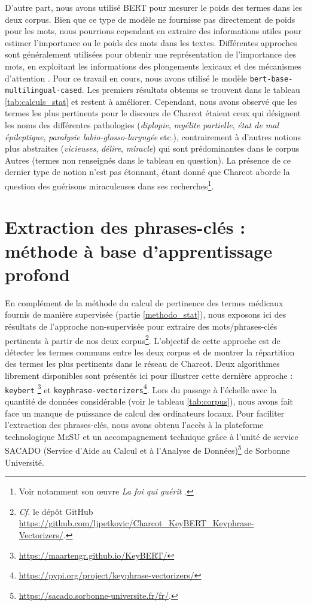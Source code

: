 D'autre part, nous avons utilisé \textsc{BERT} pour mesurer le poids des termes dans les deux corpus. Bien que ce type de modèle ne fournisse pas directement de poids pour les mots, nous pourrions cependant en extraire des informations utiles pour estimer l'importance ou le poids des mots dans les textes. Différentes approches sont généralement utilisées pour obtenir une représentation de l'importance des mots, en exploitant les informations des plongements lexicaux et des mécanismes d'attention \citep{vaswani2023}. Pour ce travail en cours, nous avons utilisé le modèle \texttt{bert-base-multilingual-cased}. Les premiers résultats obtenus se trouvent dans le tableau \ref{tab:calculs_stat} et restent à améliorer. Cependant, nous avons observé que les termes les plus pertinents pour le discours de Charcot étaient ceux qui désignent les noms des différentes pathologies (\textit{diplopie}, \textit{myélite partielle}, \textit{état de mal épileptique}, \textit{paralysie labio-glosso-laryngée} etc.), contrairement à d'autres notions plus abstraites (\textit{vicieuses}, \textit{délire}, \textit{miracle}) qui sont prédominantes dans le corpus
\og{}Autres\fg{} (termes non renseignés dans le tableau en question). La présence de ce dernier type de notion n'est pas étonnant, étant donné que Charcot aborde la question des guérisons miraculeuses dans ses recherches\footnote{Voir notamment son \oe{}uvre \textit{La foi qui guérit} \citep{charcot1897foi}.}. 



\section{Extraction des phrases-clés : méthode à base d'apprentissage profond}
En complément de la méthode du calcul de pertinence des termes médicaux fournis de manière supervisée (partie \ref{methodo_stat}), nous exposons ici des résultats de l'approche non-supervisée pour extraire des mots/phrases-clés  pertinents à partir de nos deux corpus\footnote{\textit{Cf.} le dépôt GitHub \url{https://github.com/ljpetkovic/Charcot\_KeyBERT\_Keyphrase-Vectorizers/}.}. L'objectif de cette approche est de détecter les termes communs entre les deux corpus et de montrer la répartition des termes les plus pertinents dans le réseau de Charcot. Deux algorithmes librement disponibles sont présentés ici pour illustrer cette dernière approche : \texttt{keybert} \citep{grootendorst2023}\footnote{\url{https://maartengr.github.io/KeyBERT/}} et \texttt{keyphrase-vectorizers}\footnote{\url{https://pypi.org/project/keyphrase-vectorizers/}}. Lors du passage à l'échelle avec la quantité de données considérable (voir le tableau \ref{tab:corpus}), nous avons fait face un manque de puissance de calcul des ordinateurs locaux. Pour faciliter l'extraction des phrases-clés, nous avons obtenu l'accès à la plateforme technologique \textsc{MeSU} et un accompagnement technique grâce à l'unité de service \textsc{SACADO} (Service d'Aide au Calcul et à l'Analyse de Données)\footnote{\url{https://sacado.sorbonne-universite.fr/fr/}.} de Sorbonne Université.

